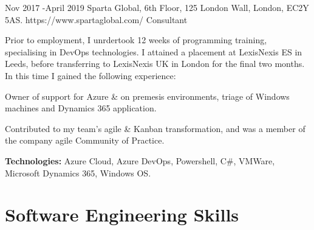 \documentclass[10pt]{article} %
\begin{document}
\job
{Nov 2017 -}{April 2019}
{Sparta Global, 6th Floor, 125 London Wall, London, EC2Y 5AS.}
{https://www.spartaglobal.com/}
{Consultant}
{
Prior to employment, I unrdertook 12 weeks of programming training, specialising in DevOps technologies. I attained a placement at LexisNexis ES in Leeds, before transferring to LexisNexis UK in London for the final two months. In this time I gained the following experience:

\begin{itemize-noindent}[noitemsep]
\item{Owner of support for Azure \& on premesis environments, triage of Windows machines and Dynamics 365 application.}
\item{Contributed to my team's agile \& Kanban transformation, and was a member of the company agile Community of Practice.}
\end{itemize-noindent}

\rule{0mm}{5mm}\textbf{Technologies:} Azure Cloud, Azure DevOps, Powershell, C\#, VMWare, Microsoft Dynamics 365, Windows OS.}


\section{Software Engineering Skills}
\end{document}
